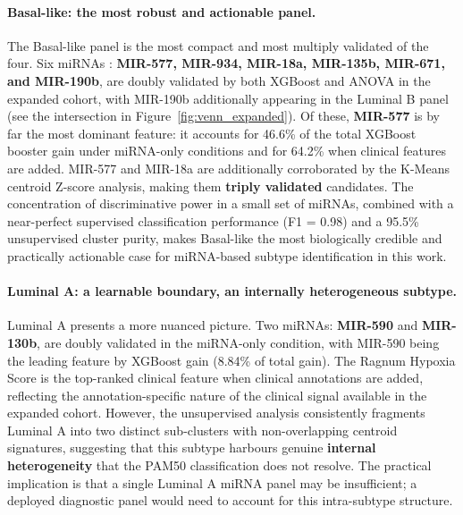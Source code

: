 \paragraph{Basal-like: the most robust and actionable panel.}
The Basal-like panel is the most compact and most multiply validated of the four.
Six miRNAs : \textbf{MIR-577, MIR-934, MIR-18a, MIR-135b, MIR-671, and MIR-190b},
 are doubly validated by both XGBoost and ANOVA in the expanded cohort, with
MIR-190b additionally appearing in the Luminal B panel (see the intersection in
Figure~\ref{fig:venn_expanded}). Of these, \textbf{MIR-577} is by far the most
dominant feature: it accounts for 46.6\% of the total XGBoost booster gain under
miRNA-only conditions and for 64.2\% when clinical features are added. MIR-577 and
MIR-18a are additionally corroborated by the K-Means centroid Z-score analysis,
making them \textbf{triply validated} candidates. The concentration of discriminative
power in a small set of miRNAs, combined with a near-perfect supervised classification
performance (F1 = 0.98) and a 95.5\% unsupervised cluster purity, makes Basal-like
the most biologically credible and practically actionable case for miRNA-based subtype
identification in this work.
 
\paragraph{Luminal A: a learnable boundary, an internally heterogeneous subtype.}
Luminal A presents a more nuanced picture. Two miRNAs: \textbf{MIR-590} and
\textbf{MIR-130b}, are doubly validated in the miRNA-only condition, with MIR-590
being the leading feature by XGBoost gain (8.84\% of total gain). The Ragnum Hypoxia
Score is the top-ranked clinical feature when clinical annotations are added, reflecting
the annotation-specific nature of the clinical signal available in the expanded cohort.
However, the unsupervised analysis consistently fragments Luminal A into two distinct
sub-clusters with non-overlapping centroid signatures, suggesting that this subtype
harbours genuine \textbf{internal heterogeneity} that the PAM50 classification does
not resolve. The practical implication is that a single Luminal A miRNA panel may be
insufficient; a deployed diagnostic panel would need to account for this intra-subtype
structure.
 
